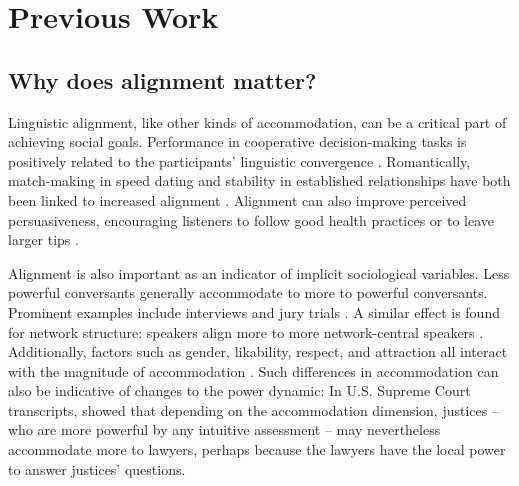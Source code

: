 \documentclass[11pt]{article}
\begin{document}

%
%





\section{Previous Work}

\subsection{Why does alignment matter?}

Linguistic alignment, like other kinds of accommodation, can be a critical part of achieving social goals.  Performance in cooperative decision-making tasks is  positively related to the participants' linguistic convergence \cite{FusaroliEtAl2012,KacewiczEtAl2013}.  Romantically, match-making in speed dating and stability in established relationships have both been linked to increased alignment \cite{IrelandEtAl2011}. Alignment can also improve perceived persuasiveness, encouraging listeners to follow good health practices \cite{KlineCeropski1984} or to leave larger tips \cite{vanBaarenEtAl2003}.

Alignment is also important as an indicator of implicit sociological variables. Less powerful conversants generally accommodate to more to powerful conversants. Prominent examples include interviews and jury trials \cite{WillemynsEtAl1997,Gnisci2005,DNMEtAl2012}.  A similar effect is found for network structure: speakers align more to more network-central speakers \cite{NobleFernandez2015}.  Additionally, factors such as gender, likability, respect, and attraction all interact with the magnitude of accommodation \cite{BilousKrauss1988,Natale1975}. Such differences in accommodation can also be indicative of changes to the power dynamic: In U.S. Supreme Court transcripts, \cite{guo2015} showed that depending on the accommodation dimension, justices -- who are more powerful by any intuitive assessment -- may nevertheless accommodate more to lawyers, perhaps because the lawyers have the local power to answer justices' questions.
\end{document}
